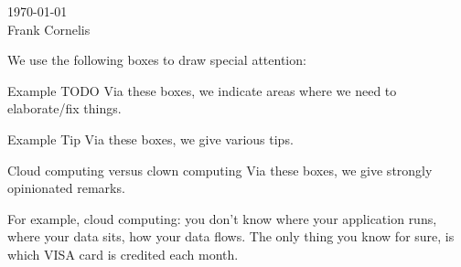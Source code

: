  \begin{flushright}
\today \\
Frank Cornelis 
\end{flushright}

We use the following boxes to draw special attention:
\begin{TODO}{Example TODO}
	Via these boxes, we indicate areas where we need to elaborate/fix things.
\end{TODO}
\begin{TIP}{Example Tip}
	Via these boxes, we give various tips.
\end{TIP}
\begin{ClownComputing}{Cloud computing versus clown computing}
	Via these boxes, we give strongly opinionated remarks.
	
	For example, cloud computing: you don't know where your application runs, where your data sits, how your data flows.
	The only thing you know for sure, is which VISA card is credited each month.  
\end{ClownComputing}